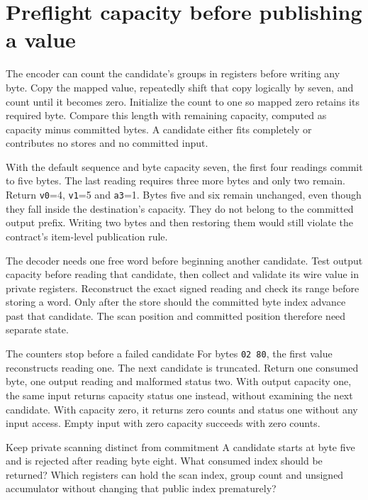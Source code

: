 \section{Preflight capacity before publishing a value}
The encoder can count the candidate's groups in registers before writing any byte.
Copy the mapped value, repeatedly shift that copy logically by seven, and count until
it becomes zero. Initialize the count to one so mapped zero retains its required byte.
Compare this length with remaining capacity, computed as capacity minus committed bytes.
A candidate either fits completely or contributes no stores and no committed input.

With the default sequence and byte capacity seven, the first four readings commit to
five bytes. The last reading requires three more bytes and only two remain. Return
\texttt{v0}=4, \texttt{v1}=5 and \texttt{a3}=1. Bytes five and six remain unchanged,
even though they fall inside the destination's capacity. They do not belong to the
committed output prefix. Writing two bytes and then restoring them would still violate
the contract's item-level publication rule.

The decoder needs one free word before beginning another candidate. Test output
capacity before reading that candidate, then collect and validate its wire value in
private registers. Reconstruct the exact signed reading and check its range before
storing a word. Only after the store should the committed byte index advance past that
candidate. The scan position and committed position therefore need separate state.

\begin{MARSWorkedExample}{The counters stop before a failed candidate}
  For bytes \texttt{02 80}, the first value reconstructs reading one. The next candidate
  is truncated. Return one consumed byte, one output reading and malformed status two.
  With output capacity one, the same input returns capacity status one instead, without
  examining the next candidate. With capacity zero, it returns zero counts and status
  one without any input access. Empty input with zero capacity succeeds with zero counts.
\end{MARSWorkedExample}

\begin{MARSExercise}{Keep private scanning distinct from commitment}
  A candidate starts at byte five and is rejected after reading byte eight. What consumed
  index should be returned? Which registers can hold the scan index, group count and
  unsigned accumulator without changing that public index prematurely?
\end{MARSExercise}
